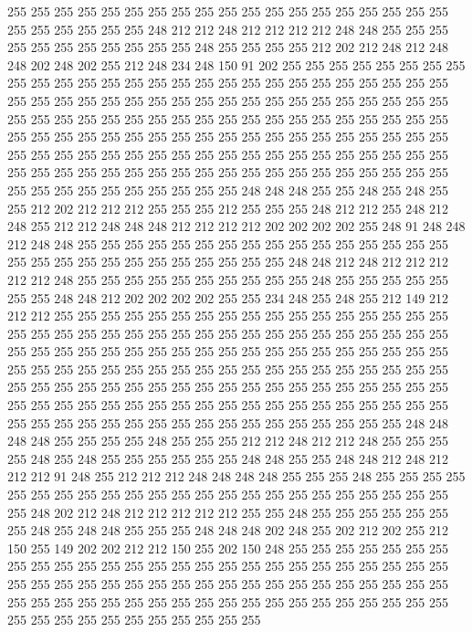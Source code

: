 255 255 255 255 255 255 255 255 255 255 255 255 255 255 255 255 255 255 255 255
255 255 255 255 255 248 212 212 248 212 212 212 212 248 248 255 255 255 255 255
255 255 255 255 255 255 248 255 255 255 255 212 202 212 248 212 248 248 202 248
202 255 212 248 234 248 150 91 202 255 255 255 255 255 255 255 255 255 255 255
255 255 255 255 255 255 255 255 255 255 255 255 255 255 255 255 255 255 255 255
255 255 255 255 255 255 255 255 255 255 255 255 255 255 255 255 255 255 255 255
255 255 255 255 255 255 255 255 255 255 255 255 255 255 255 255 255 255 255 255
255 255 255 255 255 255 255 255 255 255 255 255 255 255 255 255 255 255 255 255
255 255 255 255 255 255 255 255 255 255 255 255 255 255 255 255 255 255 255 255
255 255 255 255 255 255 255 255 255 255 255 255 255 255 255 255 255 255 255 255
255 248 248 248 255 255 248 255 248 255 255 212 202 212 212 212 255 255 255 212
255 255 255 248 212 212 255 248 212 248 255 212 212 248 248 248 212 212 212 212
202 202 202 202 255 248 91 248 248 212 248 248 255 255 255 255 255 255 255 255
255 255 255 255 255 255 255 255 255 255 255 255 255 255 255 255 255 255 255 255
248 248 212 248 212 212 212 212 212 248 255 255 255 255 255 255 255 255 255 255
248 255 255 255 255 255 255 255 248 248 212 202 202 202 202 255 255 234 248 255
248 255 212 149 212 212 212 255 255 255 255 255 255 255 255 255 255 255 255 255
255 255 255 255 255 255 255 255 255 255 255 255 255 255 255 255 255 255 255 255
255 255 255 255 255 255 255 255 255 255 255 255 255 255 255 255 255 255 255 255
255 255 255 255 255 255 255 255 255 255 255 255 255 255 255 255 255 255 255 255
255 255 255 255 255 255 255 255 255 255 255 255 255 255 255 255 255 255 255 255
255 255 255 255 255 255 255 255 255 255 255 255 255 255 255 255 255 255 255 255
255 255 255 255 255 255 255 255 255 255 255 255 255 255 255 255 248 248 248 248
255 255 255 255 248 255 255 255 212 212 248 212 212 248 255 255 255 255 248 255
248 255 255 255 255 255 255 248 248 255 255 248 248 212 248 212 212 212 91 248
255 212 212 212 248 248 248 248 255 255 255 248 255 255 255 255 255 255 255 255
255 255 255 255 255 255 255 255 255 255 255 255 255 255 255 255 248 202 212 248
212 212 212 212 212 255 255 248 255 255 255 255 255 255 255 248 255 248 248 255
255 255 248 248 248 202 248 255 202 212 202 255 212 150 255 149 202 202 212 212
150 255 202 150 248 255 255 255 255 255 255 255 255 255 255 255 255 255 255 255
255 255 255 255 255 255 255 255 255 255 255 255 255 255 255 255 255 255 255 255
255 255 255 255 255 255 255 255 255 255 255 255 255 255 255 255 255 255 255 255
255 255 255 255 255 255 255 255 255 255 255 255 255 255 255 255 255 255 255 255
